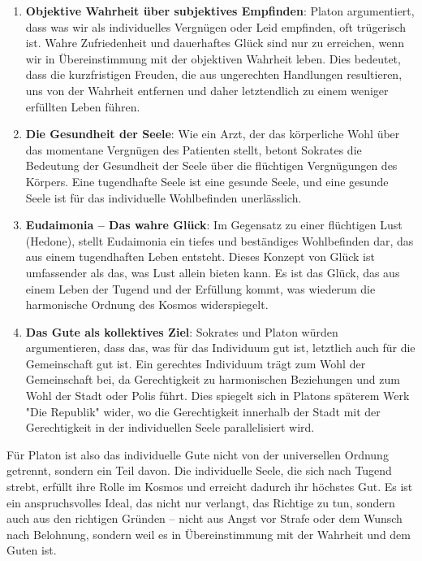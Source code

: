 \documentclass[12pt,a4paper]{article}
\begin{document}
\begin{enumerate}
\item 
\textbf{Objektive Wahrheit über subjektives Empfinden}: Platon argumentiert, dass was wir als individuelles Vergnügen oder Leid empfinden, oft trügerisch ist. Wahre Zufriedenheit und dauerhaftes Glück sind nur zu erreichen, wenn wir in Übereinstimmung mit der objektiven Wahrheit leben. Dies bedeutet, dass die kurzfristigen Freuden, die aus ungerechten Handlungen resultieren, uns von der Wahrheit entfernen und daher letztendlich zu einem weniger erfüllten Leben führen.

\item
\textbf{Die Gesundheit der Seele}: Wie ein Arzt, der das körperliche Wohl über das momentane Vergnügen des Patienten stellt, betont Sokrates die Bedeutung der Gesundheit der Seele über die flüchtigen Vergnügungen des Körpers. Eine tugendhafte Seele ist eine gesunde Seele, und eine gesunde Seele ist für das individuelle Wohlbefinden unerlässlich.

\item
\textbf{Eudaimonia – Das wahre Glück}: Im Gegensatz zu einer flüchtigen Lust (Hedone), stellt Eudaimonia ein tiefes und beständiges Wohlbefinden dar, das aus einem tugendhaften Leben entsteht. Dieses Konzept von Glück ist umfassender als das, was Lust allein bieten kann. Es ist das Glück, das aus einem Leben der Tugend und der Erfüllung kommt, was wiederum die harmonische Ordnung des Kosmos widerspiegelt.

\item
\textbf{Das Gute als kollektives Ziel}: Sokrates und Platon würden argumentieren, dass das, was für das Individuum gut ist, letztlich auch für die Gemeinschaft gut ist. Ein gerechtes Individuum trägt zum Wohl der Gemeinschaft bei, da Gerechtigkeit zu harmonischen Beziehungen und zum Wohl der Stadt oder Polis führt. Dies spiegelt sich in Platons späterem Werk "Die Republik" wider, wo die Gerechtigkeit innerhalb der Stadt mit der Gerechtigkeit in der individuellen Seele parallelisiert wird.
\end{enumerate}

Für Platon ist also das individuelle Gute nicht von der universellen Ordnung getrennt, sondern ein Teil davon. Die individuelle Seele, die sich nach Tugend strebt, erfüllt ihre Rolle im Kosmos und erreicht dadurch ihr höchstes Gut. Es ist ein anspruchsvolles Ideal, das nicht nur verlangt, das Richtige zu tun, sondern auch aus den richtigen Gründen – nicht aus Angst vor Strafe oder dem Wunsch nach Belohnung, sondern weil es in Übereinstimmung mit der Wahrheit und dem Guten ist.
\end{document}
